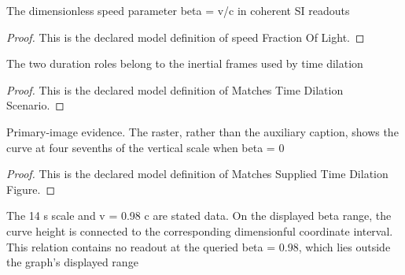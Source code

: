 \begin{definition}
  \label{def:physics:phyx-mini-0599:phyxminiproblems-problemphyxmini0599-speedfractionoflight}
  The dimensionless speed parameter beta = v/c in coherent SI readouts
\end{definition}
\begin{proof}
  This is the declared model definition of speed Fraction Of Light.
\end{proof}
\begin{definition}
  \label{def:physics:phyx-mini-0599:phyxminiproblems-problemphyxmini0599-matchestimedilationscenario}
  The two duration roles belong to the inertial frames used by time dilation
\end{definition}
\begin{proof}
  This is the declared model definition of Matches Time Dilation Scenario.
\end{proof}
\begin{definition}
  \label{def:physics:phyx-mini-0599:phyxminiproblems-problemphyxmini0599-matchessuppliedtimedilationfigure}
  Primary-image evidence. The raster, rather than the auxiliary caption, shows the curve at four sevenths of the vertical scale when beta = 0
\end{definition}
\begin{proof}
  This is the declared model definition of Matches Supplied Time Dilation Figure.
\end{proof}
\begin{definition}
  \label{def:physics:phyx-mini-0599:phyxminiproblems-problemphyxmini0599-matchesproblemreadouts}
  The 14 s scale and v = 0.98 c are stated data. On the displayed beta range, the curve height is connected to the corresponding dimensionful coordinate interval. This relation contains no readout at the queried beta = 0.98, which lies outside the graph's displayed range
\end{definition}
